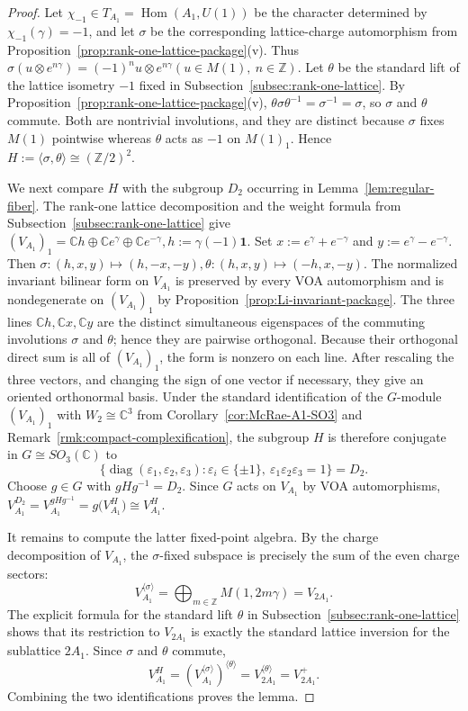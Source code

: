 \documentclass[10pt,a4paper]{amsart}
\numberwithin{equation}{section} \newtheorem{thm}{Theorem}[section] \newtheorem{lem}[thm]{Lemma} \newtheorem{ex}[thm]{Example} \newtheorem{prop}[thm]{Proposition} \newtheorem{cor}[thm]{Corollary} \newtheorem{defi}[thm]{Definition} \newtheorem{rmk}[thm]{Remark} \newtheorem{notation}[thm]{Notation}
\newcommand{\one}{\mathbf{1}}
\newcommand{\Hom}{\operatorname{Hom}}
\def\Z{\mathbb{Z}} \def\N{\mathbb{N}} \def\A{\mathbb{A}} \def\C{\mathbb{C}} \def\R{\mathbb{R}} \def\Q{\mathbb{Q}} \def\F{\mathbb{F}}
\begin{document}
\begin{proof}
Let $\chi_{-1}\in T_{A_1}=\Hom(A_1,U(1))$ be the character determined by \(\chi_{-1}(\gamma)=-1\), and let $\sigma$ be the corresponding lattice-charge automorphism from Proposition~\ref{prop:rank-one-lattice-package}\textnormal{(v)}. Thus \(\sigma(u\otimes e^{n\gamma})=(-1)^n u\otimes e^{n\gamma} (u\in M(1),\ n\in\Z).\) Let $\theta$ be the standard lift of the lattice isometry $-1$ fixed in Subsection~\ref{subsec:rank-one-lattice}. By Proposition~\ref{prop:rank-one-lattice-package}\textnormal{(v)}, \(\theta\sigma\theta^{-1}=\sigma^{-1}=\sigma\), so $\sigma$ and $\theta$ commute. Both are nontrivial involutions, and they are distinct because $\sigma$ fixes $M(1)$ pointwise whereas $\theta$ acts as $-1$ on $M(1)_1$. Hence \(H:=\langle\sigma,\theta\rangle\cong(\Z/2)^2.\)

We next compare $H$ with the subgroup $D_2$ occurring in Lemma~\ref{lem:regular-fiber}. The rank-one lattice decomposition and the weight formula from Subsection~\ref{subsec:rank-one-lattice} give \((V_{A_1})_1 =\C h\oplus\C e^\gamma\oplus\C e^{-\gamma}, h:=\gamma(-1)\one.\) Set \(x:=e^\gamma+e^{-\gamma}\) and \(y:=e^\gamma-e^{-\gamma}.\) Then \(\sigma:(h,x,y)\longmapsto(h,-x,-y), \theta:(h,x,y)\longmapsto(-h,x,-y).\) The normalized invariant bilinear form on $V_{A_1}$ is preserved by every VOA automorphism and is nondegenerate on $(V_{A_1})_1$ by Proposition~\ref{prop:Li-invariant-package}. The three lines $\C h,\C x,\C y$ are the distinct simultaneous eigenspaces of the commuting involutions $\sigma$ and $\theta$; hence they are pairwise orthogonal. Because their orthogonal direct sum is all of $(V_{A_1})_1$, the form is nonzero on each line. After rescaling the three vectors, and changing the sign of one vector if necessary, they give an oriented orthonormal basis. Under the standard identification of the $G$-module $(V_{A_1})_1$ with $W_2\cong\C^3$ from Corollary~\ref{cor:McRae-A1-SO3} and Remark~\ref{rmk:compact-complexification}, the subgroup $H$ is therefore conjugate in $G\cong SO_3(\C)$ to
\[
\{\operatorname{diag}(\varepsilon_1,\varepsilon_2,\varepsilon_3):
\varepsilon_i\in\{\pm1\},\ \varepsilon_1\varepsilon_2\varepsilon_3=1\}
=D_2.
\]
Choose $g\in G$ with $gHg^{-1}=D_2$. Since $G$ acts on $V_{A_1}$ by VOA automorphisms, \(V_{A_1}^{D_2}=V_{A_1}^{gHg^{-1}}=g\bigl(V_{A_1}^{H}\bigr) \cong V_{A_1}^{H}.\)

It remains to compute the latter fixed-point algebra. By the charge decomposition of $V_{A_1}$, the $\sigma$-fixed subspace is precisely the sum of the even charge sectors:
\[
V_{A_1}^{\langle\sigma\rangle}=\bigoplus_{m\in\Z}M(1,2m\gamma)=V_{2A_1}.
\] The explicit formula for the standard lift $\theta$ in Subsection~\ref{subsec:rank-one-lattice} shows that its restriction to $V_{2A_1}$ is exactly the standard lattice inversion for the sublattice $2A_1$. Since $\sigma$ and $\theta$ commute,
\[
V_{A_1}^{H}
 =\left(V_{A_1}^{\langle\sigma\rangle}\right)^{\langle\theta\rangle}
 =V_{2A_1}^{\langle\theta\rangle}
 =V_{2A_1}^+.
\]
Combining the two identifications proves the lemma.
\end{proof}
\end{document}
